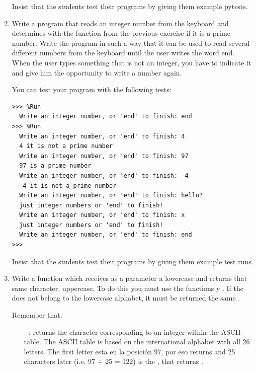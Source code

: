 \documentclass[
  fontsize=10pt,
  a4paper,
]{scrartcl}
\newenvironment{howTILEd}%
  {\begin{mdframed}[skipabove=10pt,skipbelow=10pt,backgroundcolor=pink!40]}%
  {\end{mdframed}}
\begin{document}
\begin{enumerate}
\begin{howTILEd}
Insist that the students test their programs by giving them example pytests.
\end{howTILEd}


\item Write a program that reads an integer number from the keyboard and determines with the function  from the previous exercise if it is a prime number. Write the program in such a way that it can be used to read several different numbers from the keyboard until the user writes the word end. When the user types something that is not an integer, you have to indicate it and give him the opportunity to write a number again.

You can test your program with the following tests:

\begin{Verbatim}[frame=single, label={\em ejemlos de test ejecuciones}]
>>> %Run 
  Write an integer number, or 'end' to finish: end
>>> %Run 
  Write an integer number, or 'end' to finish: 4
  4 it is not a prime number
  Write an integer number, or 'end' to finish: 97
  97 is a prime number
  Write an integer number, or 'end' to finish: -4
  -4 it is not a prime number
  Write an integer number, or 'end' to finish: hello?
  just integer numbers or 'end' to finish!
  Write an integer number, or 'end' to finish: x
  just integer numbers or 'end' to finish!
  Write an integer number, or 'end' to finish: end
>>> 
\end{Verbatim}

\begin{howTILEd}
Insist that the students test their programs by giving them example test runs.
\end{howTILEd}


\item Write a function  which receives as a parameter a lowercase  and returns that same character, uppercase. To do this you must use the functions  y . If the  does not belong to the lowercase alphabet, it must be returned the same .

Remember that:

\begin{itemize}
\item[-] : returns the character corresponding to an integer within the ASCII table. The ASCII table is based on the international alphabet with all 26 letters.
The first letter  esta en la posición 97, por eso  returns  and 25 characters later (i.e. 97 + 25 = 122) is the , that returns .


\end{itemize}
\end{enumerate}
\end{document}
